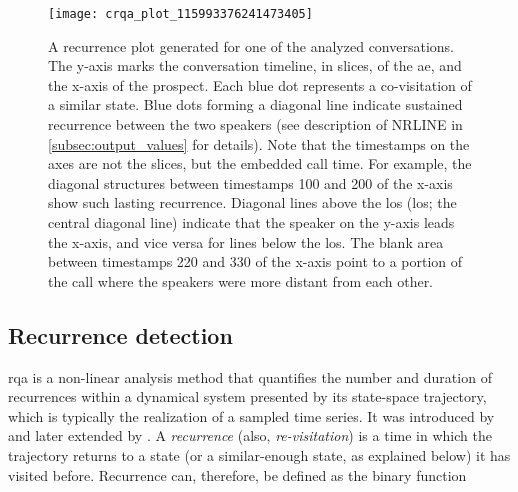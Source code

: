 \begin{figure}[H]
	\centering
	\texttt{[image: crqa\_plot\_115993376241473405]}
	\caption[\acs{crqa} analysis of pitch in a sales call]
		{A recurrence plot generated for one of the analyzed conversations.
		The y-axis marks the conversation timeline, in slices, of the \ac{ae}, and the x-axis of the prospect.
		Each blue dot represents a co-visitation of a similar state.
		Blue dots forming a diagonal line indicate sustained recurrence between the two speakers (see description of NRLINE in \cref{subsec:output_values} for details).
		Note that the timestamps on the axes are not the slices, but the embedded call time.
		For example, the diagonal structures between timestamps 100 and 200 of the x-axis show such lasting recurrence.
		Diagonal lines above the \acl{los} (\acs{los}; the central diagonal line) indicate that the speaker on the y-axis leads the x-axis, and vice versa for lines below the \ac{los}.
		The blank area between timestamps 220 and 330 of the x-axis point to a portion of the call where the speakers were more distant from each other.}
	\label{fig:crqa_plot}
\end{figure}

\subsection{Recurrence detection}
\label{subsec:recurrence_detection}

\Ac{rqa} is a non-linear analysis method that quantifies the number and duration of recurrences within a dynamical system presented by its state-space trajectory, which is typically the realization of a sampled time series.
It was introduced by \citet{Zbilut1992embeddings} and later extended by \citet{Webber2005recurrence, Marwan2002cross}.
A \emph{recurrence} (also, \emph{re-visitation}) is a time in which the trajectory returns to a state (or a similar-enough state, as explained below) it has visited before.
Recurrence can, therefore, be defined as the binary function

